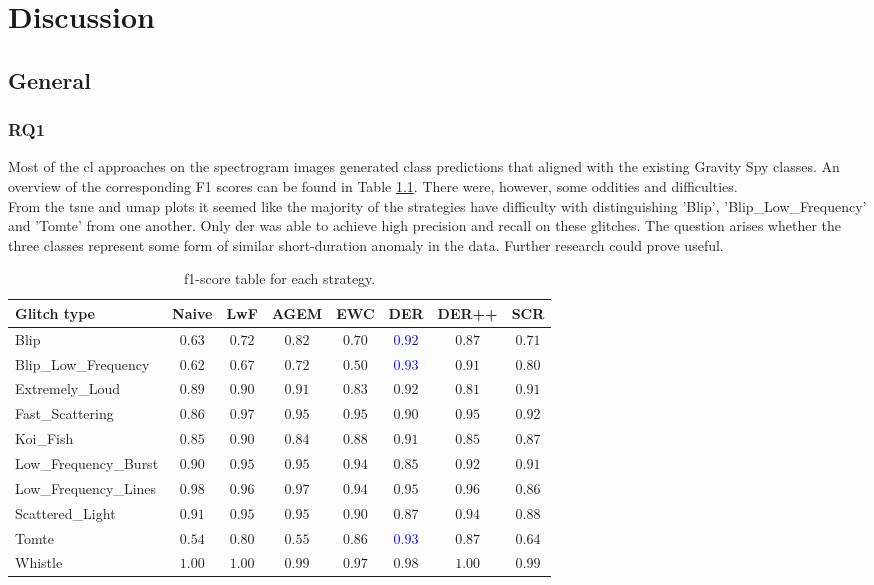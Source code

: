\chapter{Discussion}
\label{ch:5}
\section{General}
\subsection{RQ1}
Most of the \acrshort{cl} approaches on the spectrogram images generated class predictions that aligned with the existing Gravity Spy classes. An overview of the corresponding F1 scores can be found in Table \ref{tbl:RQ1_discus_overview_f1_score}. There were, however, some oddities and difficulties. \\
From the \acrshort{tsne} and \acrshort{umap} plots it seemed like the majority of the strategies have difficulty with distinguishing 'Blip', 'Blip\_Low\_Frequency' and 'Tomte' from one another. Only \acrshort{der} was able to achieve high precision and recall on these glitches. The question arises whether the three classes represent some form of similar short-duration anomaly in the data.  Further research could prove useful.

\begin{table}[ht]
\centering
    \begin{tabular}{|l|c c c c c c c|}
    \hline
    \textbf{Glitch type} & \textbf{Naive} & \textbf{LwF} & \textbf{AGEM} & \textbf{EWC} & \textbf{DER} & \textbf{DER++} & \textbf{SCR}\\ \hline
    Blip & $0.63$ & $0.72$ & $0.82$ & $0.70$ & \textcolor{blue}{$0.92$} & $0.87$ & $0.71$\\
    Blip\_Low\_Frequency & $0.62$ & $0.67$ & $0.72$ & $0.50$ & \textcolor{blue}{$0.93$} & $0.91$ & $0.80$\\
    Extremely\_Loud & $0.89$ & $0.90$ &  $0.91$ & $0.83$ & $0.92$ & $0.81$ & $0.91$\\
    Fast\_Scattering & $0.86$ & $0.97$ &  $0.95$ & $0.95$ & $0.90$ & $0.95$ & $0.92$\\
    Koi\_Fish & $0.85$ & $0.90$ & $0.84$ & $0.88$ & $0.91$ & $0.85$ & $0.87$\\
    Low\_Frequency\_Burst & $0.90$ & $0.95$ & $0.95$ & $0.94$ & $0.85$ & $0.92$ & $0.91$\\
    Low\_Frequency\_Lines & $0.98$ & $0.96$ & $0.97$ & $0.94$ & $0.95$ & $0.96$ & $0.86$\\
    Scattered\_Light & $0.91$ & $0.95$ &$0.95$ & $0.90$ & $0.87$ & $0.94$ & $0.88$\\
    Tomte & $0.54$ & $0.80$ &$0.55$ & $0.86$ & \textcolor{blue}{$0.93$} & $0.87$ & $0.64$\\
    Whistle & $1.00$ & $1.00$ & $0.99$ & $0.97$ & $0.98$ & $1.00$ & $0.99$\\
    \hline
    \end{tabular}
    \caption{f1-score table for each strategy.}
    \label{tbl:RQ1_discus_overview_f1_score}
\end{table}

